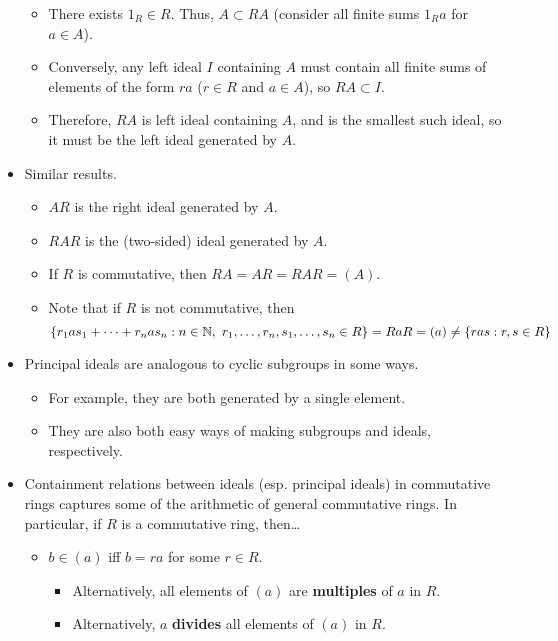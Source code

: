 \documentclass[../notes.tex]{subfiles}
\begin{document}
\begin{itemize}
\begin{itemize}
        \item There exists $1_R\in R$. Thus, $A\subset RA$ (consider all finite sums $1_Ra$ for $a\in A$).
        \item Conversely, any left ideal $I$ containing $A$ must contain all finite sums of elements of the form $ra$ ($r\in R$ and $a\in A$), so $RA\subset I$.
        \item Therefore, $RA$ is left ideal containing $A$, and is the smallest such ideal, so it must be the left ideal generated by $A$.
    \end{itemize}
    \item Similar results.
    \begin{itemize}
        \item $AR$ is the right ideal generated by $A$.
        \item $RAR$ is the (two-sided) ideal generated by $A$.
        \item If $R$ is commutative, then $RA=AR=RAR=(A)$.
        \item {}Note that if $R$ is not commutative, then
        \begin{equation*}
            \{r_1as_1+\cdots+r_nas_n:n\in\N,\ r_1,\dots,r_n,s_1,\dots,s_n\in R\} = RaR = (a) \neq \{ras:r,s\in R\}
        \end{equation*}
    \end{itemize}
    \item Principal ideals are analogous to cyclic subgroups in some ways.
    \begin{itemize}
        \item For example, they are both generated by a single element.
        \item They are also both easy ways of making subgroups and ideals, respectively.
    \end{itemize}
    \item Containment relations between ideals (esp. principal ideals) in commutative rings captures some of the arithmetic of general commutative rings. In particular, if $R$ is a commutative ring, then\dots
    \begin{itemize}
        \item $b\in(a)$ iff $b=ra$ for some $r\in R$.
        \begin{itemize}
            \item Alternatively, all elements of $(a)$ are \textbf{multiples} of $a$ in $R$.
            \item Alternatively, $a$ \textbf{divides} all elements of $(a)$ in $R$.

\end{itemize}
\end{itemize}
\end{itemize}
\end{document}
